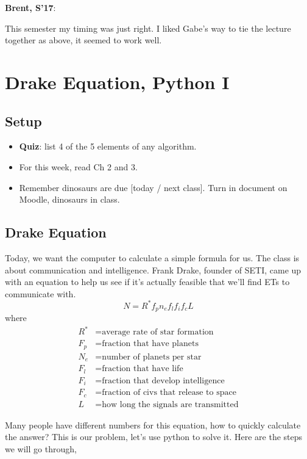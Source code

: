 \documentclass{article}
\newenvironment{reflect}[1]
{
  \noindent
  \begin{lrbox}{\reflectbox}
    \begin{minipage}[t]{\textwidth}
      \textbf{#1}:
}{
    \end{minipage}
  \end{lrbox}
  \fbox{\usebox{\reflectbox}}
}
\begin{document}
\begin{reflect}{Brent, S'17}
  This semester my timing was just right.  I liked Gabe's way to tie
  the lecture together as above, it seemed to work well.
\end{reflect}
\newpage

\section{Drake Equation, Python I}

\subsection*{Setup}

\begin{itemize}
\item \textbf{Quiz}: list 4 of the 5 elements of any algorithm.
\item For this week, read Ch 2 and 3.
\item Remember dinosaurs are due [today / next class].  Turn in
  document on Moodle, dinosaurs in class.
\end{itemize}

\subsection*{Drake Equation}

Today, we want the computer to calculate a simple formula for us.  The
class is about communication and intelligence.  Frank Drake, founder
of SETI, came up with an equation to help us see if it's actually
feasible that we'll find ETs to communicate with.
\[ N = R^* f_p n_e f_l f_i f_c L \]
where
\begin{align*}
R^* &= \text{average rate of star formation} \\
F_p &= \text{fraction that have planets} \\
N_e &= \text{number of planets per star} \\
F_l &= \text{fraction that have life} \\
F_i &= \text{fraction that develop intelligence} \\
F_c &= \text{fraction of civs that release to space} \\
L &= \text{how long the signals are transmitted}
\end{align*}

Many people have different numbers for this equation, how to quickly
calculate the answer?  This is our problem, let's use python to solve
it.  Here are the steps we will go through,
\end{document}
